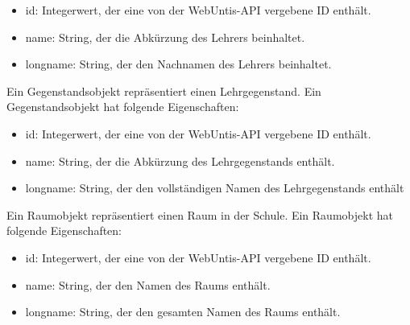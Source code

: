 \begin{itemize}
    \item id: Integerwert, der eine von der WebUntis-API vergebene ID enthält.
    \item name: String, der die Abkürzung des Lehrers beinhaltet.
    \item longname: String, der den Nachnamen des Lehrers beinhaltet. 
\end{itemize}


Ein Gegenstandsobjekt repräsentiert einen Lehrgegenstand. Ein Gegenstandsobjekt hat folgende Eigenschaften: 

\begin{itemize}
    \item id: Integerwert, der eine von der WebUntis-API vergebene ID enthält. 
    \item name: String, der die Abkürzung des Lehrgegenstands enthält.
    \item longname: String, der den vollständigen Namen des Lehrgegenstands enthält
\end{itemize}


Ein Raumobjekt repräsentiert einen Raum in der Schule. Ein Raumobjekt hat folgende Eigenschaften: 

\begin{itemize}
    \item id: Integerwert, der eine von der WebUntis-API vergebene ID enthält.
    \item name: String, der den Namen des Raums enthält.
    \item longname: String, der den gesamten Namen des Raums enthält. 
\end{itemize}